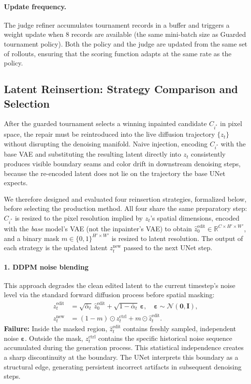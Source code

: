 \paragraph{Update frequency.}
The judge refiner accumulates tournament records in a buffer and triggers
a weight update when 8 records are available (the same mini-batch size as Guarded tournament policy).
Both the policy and the judge are updated from the same set of rollouts,
ensuring that the scoring function adapts at the same rate as the policy.
\subsection{Latent Reinsertion: Strategy Comparison and Selection}
\label{app:reinsertion_strategies}
 \fi
After the guarded tournament selects a winning inpainted candidate
$C_{i^*}$ in pixel space, the repair must be reintroduced into the live
diffusion trajectory $\{z_t\}$ without disrupting the denoising manifold.
Naive injection, encoding $C_{i^*}$ with the base VAE and substituting the resulting latent directly into $z_t$ consistently produces visible boundary seams and color drift in downstream denoising steps, because the re-encoded latent does not lie on the trajectory the base UNet expects.

We therefore designed and evaluated four reinsertion strategies, formalized below, before selecting the production method.
All four share the same preparatory step: $C_{i^*}$ is resized to the pixel resolution implied by $z_t$'s spatial dimensions, encoded with the \emph{base} model's VAE (not the inpainter's VAE) to obtain $\hat{z}_0^{\mathrm{edit}} \in \mathbb{R}^{C \times H' \times W'}$, and a binary mask $m \in \{0,1\}^{H' \times W'}$ is resized to latent resolution. The output of each strategy is the updated latent $z_t^{\mathrm{new}}$ passed to the next UNet step.

\paragraph{1. DDPM noise blending}
This approach degrades the clean edited latent to the current timestep's noise level via the standard forward diffusion process \citep{ho2020denoising} before spatial masking:
\begin{align*}
  \hat{z}_t^{\mathrm{edit}}
  &= \sqrt{\bar{\alpha}_t}\,\hat{z}_0^{\mathrm{edit}}
   + \sqrt{1-\bar{\alpha}_t}\,\boldsymbol{\varepsilon},
   \quad \boldsymbol{\varepsilon} \sim \mathcal{N}(\mathbf{0},\mathbf{I}), \\
  z_t^{\mathrm{new}}
  &= (1-m)\odot z_t^{\mathrm{ctrl}}
   + m\odot \hat{z}_t^{\mathrm{edit}}.
\end{align*}
\textbf{Failure:} Inside the masked region, $\hat{z}_t^{\mathrm{edit}}$ contains freshly sampled, independent noise $\boldsymbol{\varepsilon}$. Outside the mask, $z_t^{\mathrm{ctrl}}$ contains the specific historical noise sequence accumulated during the generation process. This statistical independence creates a sharp discontinuity at the boundary. The UNet interprets this boundary as a structural edge, generating persistent incorrect artifacts in subsequent denoising steps.

